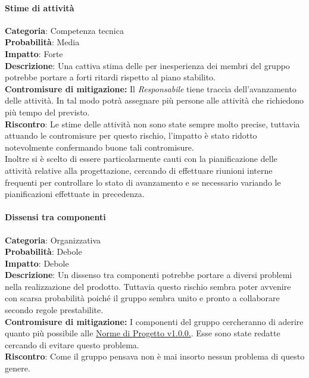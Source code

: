\documentclass{scalatekids-article}
\begin{document}
\paragraph{Stime di attività}
\textbf{Categoria}: Competenza tecnica\\
\textbf{Probabilità}: Media\\
\textbf{Impatto}: Forte\\
\textbf{Descrizione}: Una cattiva stima delle  per inesperienza dei membri del gruppo potrebbe portare a forti ritardi rispetto al piano stabilito.\\
\textbf{Contromisure di mitigazione:} Il \textit{Responsabile} tiene traccia dell'avanzamento delle attività. In tal modo potrà assegnare più persone alle attività che richiedono più tempo del previsto.\\
\textbf{Riscontro}:
Le stime delle attività non sono state sempre molto precise, tuttavia attuando le contromisure per questo rischio, l'impatto è stato ridotto notevolmente confermando buone tali contromisure.\\ Inoltre si è scelto di essere particolarmente cauti con la pianificazione delle attività relative alla progettazione, cercando di effettuare riunioni interne frequenti per controllare lo stato di avanzamento e se necessario variando le pianificazioni effettuate in precedenza.

\paragraph{Dissensi tra componenti}
\textbf{Categoria}: Organizzativa\\
\textbf{Probabilità}: Debole\\
\textbf{Impatto}: Debole\\
\textbf{Descrizione}: Un dissenso tra componenti potrebbe portare a diversi problemi nella realizzazione del prodotto. Tuttavia questo rischio sembra poter avvenire con scarsa probabilità poiché il gruppo sembra unito e pronto a collaborare secondo regole prestabilite.\\
\textbf{Contromisure di mitigazione:} I componenti del gruppo cercheranno di aderire quanto più possibile alle \href{run:../Interni/NormeDiProgetto\_v1.0.0.pdf}{Norme di Progetto v1.0.0.}. Esse sono state redatte cercando di evitare questo problema.\\
\textbf{Riscontro}: Come il gruppo pensava non è mai insorto nessun problema di questo genere.\\
\end{document}
